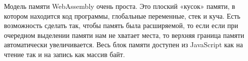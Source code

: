 
Модель памяти WebAssembly очень проста. Это плоский «кусок» памяти, в котором
находится код программы, глобальные переменные, стек и куча. Есть возможность
сделать так, чтобы память была расширяемой, то если если при очередном выделении
памяти нам не хватает места, то верхняя граница памяти автоматически
увеличивается.
Весь блок памяти доступен из JavaScript как на чтение так и на
запись как массив байт.


